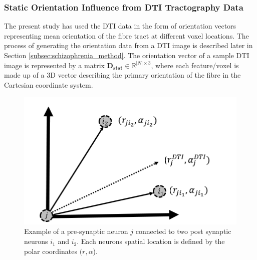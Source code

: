 \subsubsection{Static Orientation Influence from DTI Tractography Data}

The present study has used the DTI data in the form of orientation vectors representing mean orientation of the fibre tract at different voxel locations. The process of generating the orientation data from a DTI image is described later in Section \ref{subsec:schizophrenia_method}. The orientation vector of a sample DTI image is represented by a matrix $\mathbf{D_{stat}} \in \mathbb{R}^{|N|\times 3}$, where each feature/voxel is made up of a 3D vector describing the primary orientation of the fibre in the Cartesian coordinate system.   
\begin{figure}
	\centering
	\includegraphics[width=\linewidth]{fig/fmridti/angular_influence.png}
	\caption{Example of a pre-synaptic neuron $j$ connected to two post synaptic neurons $i_1$ and $i_2$. Each neurons spatial location is defined by the polar coordinates $(r, \alpha$).}
	\label{fig:ang_inf}
\end{figure}

